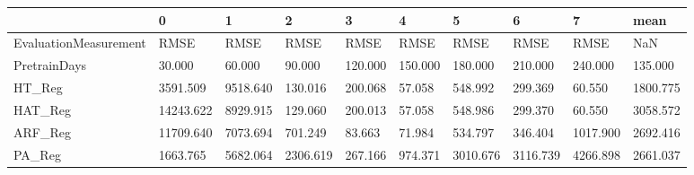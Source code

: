 \begin{tabular}{llllllllll}
\toprule
{} &         0 &        1 &        2 &       3 &       4 &        5 &        6 &        7 &     mean \\
\midrule
EvaluationMeasurement &      RMSE &     RMSE &     RMSE &    RMSE &    RMSE &     RMSE &     RMSE &     RMSE &      NaN \\
PretrainDays          &    30.000 &   60.000 &   90.000 & 120.000 & 150.000 &  180.000 &  210.000 &  240.000 &  135.000 \\
HT\_Reg                &  3591.509 & 9518.640 &  130.016 & 200.068 &  57.058 &  548.992 &  299.369 &   60.550 & 1800.775 \\
HAT\_Reg               & 14243.622 & 8929.915 &  129.060 & 200.013 &  57.058 &  548.986 &  299.370 &   60.550 & 3058.572 \\
ARF\_Reg               & 11709.640 & 7073.694 &  701.249 &  83.663 &  71.984 &  534.797 &  346.404 & 1017.900 & 2692.416 \\
PA\_Reg                &  1663.765 & 5682.064 & 2306.619 & 267.166 & 974.371 & 3010.676 & 3116.739 & 4266.898 & 2661.037 \\
\bottomrule
\end{tabular}
